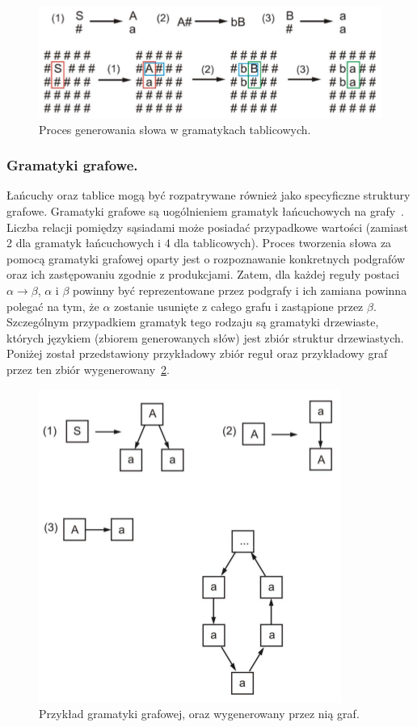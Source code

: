 \begin{figure}[h]
  \centering
  \includegraphics{images/g_tab.png}
  \caption{Proces generowania słowa w gramatykach tablicowych.~\cite{gaudi}}
  \label{g_tab}
\end{figure}

\subsubsection{Gramatyki grafowe.}
Łańcuchy oraz tablice mogą być rozpatrywane również jako specyficzne struktury
grafowe. Gramatyki grafowe są uogólnieniem gramatyk łańcuchowych na
grafy~\cite{chanda}. Liczba relacji pomiędzy sąsiadami może posiadać przypadkowe
wartości (zamiast 2 dla gramatyk łańcuchowych i 4 dla tablicowych). Proces tworzenia słowa za pomocą
gramatyki grafowej oparty jest o rozpoznawanie konkretnych podgrafów oraz ich
zastępowaniu zgodnie z produkcjami. Zatem, dla każdej reguły postaci
$\alpha\longrightarrow\beta$, $\alpha$ i $\beta$ powinny być reprezentowane
przez podgrafy i ich zamiana powinna polegać na tym, że $\alpha$ zostanie
usunięte z całego grafu i zastąpione przez $\beta$. Szczególnym przypadkiem
gramatyk tego rodzaju są gramatyki drzewiaste, których językiem (zbiorem
generowanych słów) jest zbiór struktur drzewiastych. Poniżej został
przedstawiony przykładowy zbiór reguł oraz przykładowy graf przez ten zbiór
wygenerowany~\ref{g_graf}.

\begin{figure}[h]
  \centering
  \includegraphics{images/g_graf.png}
  \caption{Przykład gramatyki grafowej, oraz wygenerowany przez nią
  graf.~\cite{gaudi}}
  \label{g_graf}
\end{figure}

